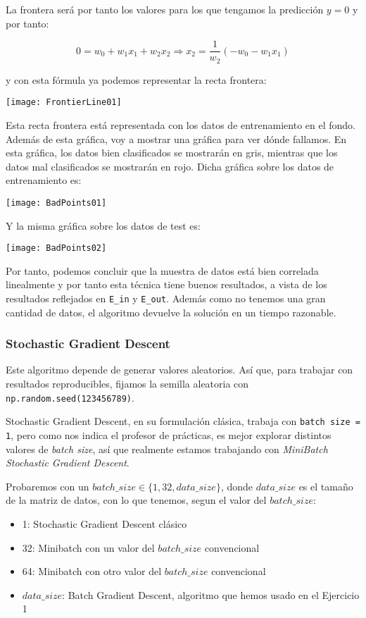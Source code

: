 \documentclass[11pt]{article}
\begin{document}
La frontera será por tanto los valores para los que tengamos la predicción $y = 0$ y por tanto:

\begin{displaymath}
    0 = w_0 + w_1 x_1 + w_2 x_2 \Longrightarrow x_2 = \frac{1}{w_2} (-w_0 - w_1 x_1)
\end{displaymath}

y con esta fórmula ya podemos representar la recta frontera:

\texttt{[image: FrontierLine01]}

Esta recta frontera está representada con los datos de entrenamiento en el fondo. Además de esta gráfica, voy a mostrar una gráfica para ver dónde fallamos. En esta gráfica, los datos bien clasificados se mostrarán en gris, mientras que los datos mal clasificados se mostrarán en rojo. Dicha gráfica sobre los datos de entrenamiento es:

\texttt{[image: BadPoints01]}

Y la misma gráfica sobre los datos de test es:

\texttt{[image: BadPoints02]}

Por tanto, podemos concluir que la muestra de datos está bien correlada linealmente y por tanto esta técnica tiene buenos resultados, a vista de los resultados reflejados en \lstinline{E_in} y \lstinline{E_out}. Además como no tenemos una gran cantidad de datos, el algoritmo devuelve la solución en un tiempo razonable.

\subsubsection{Stochastic Gradient Descent}

Este algoritmo depende de generar valores aleatorios. Así que, para trabajar con resultados reproducibles, fijamos la semilla aleatoria con \lstinline{np.random.seed(123456789)}.

Stochastic Gradient Descent, en su formulación clásica, trabaja con \lstinline{batch size = 1}, pero como nos indica el profesor de prácticas, es mejor explorar distintos valores de \emph{batch size}, así que realmente estamos trabajando con \emph{MiniBatch Stochastic Gradient Descent}.

Probaremos con un $batch\_size \in \{1, 32, data\_size\}$, donde $data\_size$ es el tamaño de la matriz de datos, con lo que tenemos, segun el valor del $batch\_size$:

\begin{itemize}
    \item 1: Stochastic Gradient Descent clásico
    \item 32: Minibatch con un valor del $batch\_size$ convencional
    \item 64: Minibatch con otro valor del $batch\_size$ convencional
    \item $data\_size$: Batch Gradient Descent, algoritmo que hemos usado en el Ejercicio 1
\end{itemize}
\end{document}
